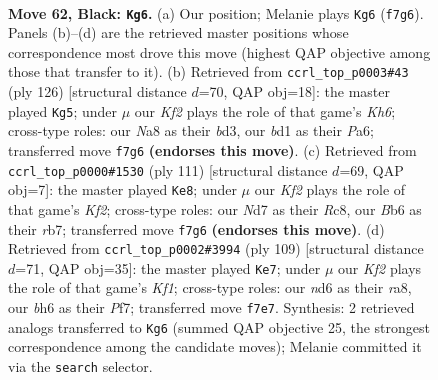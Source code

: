 \documentclass[11pt]{article}
\begin{document}
\clearpage

\begin{figure}[p]\centering
\begin{subfigure}{0.46\textwidth}\centering
\resizebox{\linewidth}{!}{%
\newchessgame
\chessboard[
  setfen={n7/3n1k2/1b1N3B/p2p1b2/8/PP2P2p/4PK2/3B4 b - - 6 62},
  showmover=false,
  pgfstyle=straightmove, color=movearrow, markmove={f7-g6}
]}
\caption{}
\end{subfigure}\hfill
\begin{subfigure}{0.46\textwidth}\centering
\resizebox{\linewidth}{!}{%
\newchessgame
\chessboard[
  setfen={6k1/1B3p2/Pb4pK/2p1P2p/7P/3bB1P1/8/8 w - - 3 64},
  showmover=false,
  pgfstyle=straightmove, color=movearrow, markmove={h6-g5}
]}
\caption{}
\end{subfigure}
\\[4pt]
\begin{subfigure}{0.46\textwidth}\centering
\resizebox{\linewidth}{!}{%
\newchessgame
\chessboard[
  setfen={2r5/1R1b1k2/4pp2/2P1b2p/4P2P/3BK3/2P5/4B3 b - - 4 56},
  showmover=false,
  pgfstyle=straightmove, color=movearrow, markmove={f7-e8}
]}
\caption{}
\end{subfigure}\hfill
\begin{subfigure}{0.46\textwidth}\centering
\resizebox{\linewidth}{!}{%
\newchessgame
\chessboard[
  setfen={R4k2/5p2/1pBn4/5b2/1PP2p2/1KBr1P2/8/8 b - - 2 55},
  showmover=false,
  pgfstyle=straightmove, color=movearrow, markmove={f8-e7}
]}
\caption{}
\end{subfigure}
\caption{\textbf{Move 62, Black: \texttt{Kg6}.} (a) Our position; Melanie plays \texttt{Kg6} (\texttt{f7g6}). Panels (b)--(d) are the retrieved master positions whose correspondence most drove this move (highest QAP objective among those that transfer to it). (b) Retrieved from \texttt{ccrl\_top\_p0003\#43} (ply 126) [structural distance $d$=70, QAP obj=18]: the master played \texttt{Kg5}; under $\mu$ our \emph{Kf2} plays the role of that game's \emph{Kh6}; cross-type roles: our \emph{N}a8 as their \emph{b}d3, our \emph{b}d1 as their \emph{P}a6; transferred move \texttt{f7g6} \textbf{(endorses this move)}. (c) Retrieved from \texttt{ccrl\_top\_p0000\#1530} (ply 111) [structural distance $d$=69, QAP obj=7]: the master played \texttt{Ke8}; under $\mu$ our \emph{Kf2} plays the role of that game's \emph{Kf2}; cross-type roles: our \emph{N}d7 as their \emph{R}c8, our \emph{B}b6 as their \emph{r}b7; transferred move \texttt{f7g6} \textbf{(endorses this move)}. (d) Retrieved from \texttt{ccrl\_top\_p0002\#3994} (ply 109) [structural distance $d$=71, QAP obj=35]: the master played \texttt{Ke7}; under $\mu$ our \emph{Kf2} plays the role of that game's \emph{Kf1}; cross-type roles: our \emph{n}d6 as their \emph{r}a8, our \emph{b}h6 as their \emph{P}f7; transferred move \texttt{f7e7}. Synthesis: 2 retrieved analogs transferred to \texttt{Kg6} (summed QAP objective 25, the strongest correspondence among the candidate moves); Melanie committed it via the \texttt{search} selector.}
\label{fig:thought-m123}
\end{figure}
\end{document}
